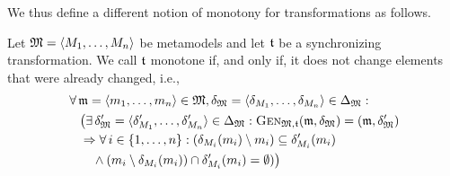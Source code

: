 We thus define a different notion of monotony for transformations as follows.
\begin{definition}
    \label{def:monotonetransformation}
    Let $\metamodeltuple{M} = \tupled{\metamodelsequence{M}{n}}$ be metamodels and let $\transformation{t}$ be a synchronizing transformation. We call $\transformation{t}$ monotone if, and only if, it does not change elements that were already changed, i.e.,
    \begin{align*}
        &
        \forall \modeltuple{m} = \tupled{\model{m}{1}, \dots, \model{m}{n}} \in \metamodeltuple{M}, \changetuple{\metamodeltuple{M}} = \tupled{\change{\metamodel{M}{1}}, \dots, \change{\metamodel{M}{n}}} \in \changeuniverse{\metamodeltuple{M}} : \\
        & \formulaskip
        \bigl(
        \exists \changetuple{\metamodeltuple{M}}' = \tupled{\change{\metamodel{M}{1}}', \dots, \change{\metamodel{M}{n}}'} \in \changeuniverse{\metamodeltuple{M}} : \generalizationfunction{\metamodeltuple{M},\transformation{t}}(\modeltuple{m}, \changetuple{\metamodeltuple{M}}) = (\modeltuple{m},\changetuple{\metamodeltuple{M}}') \\
        & \formulaskip
        \Rightarrow
        \forall i \in \setted{1, \dots, n} : 
        (\change{\metamodel{M}{i}}(\model{m}{i}) \setminus \model{m}{i}) \subseteq \change{\metamodel{M}{i}}'%
        (\model{m}{i})%
        \\
        & \formulaskip\formulaskip
        \land
        (\model{m}{i} \setminus \change{\metamodel{M}{i}}(\model{m}{i})) \cap \change{\metamodel{M}{i}}'%
        (\model{m}{i})%
         = \emptyset)
        \bigr)
    \end{align*}
\end{definition}

